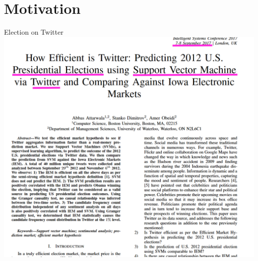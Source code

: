 \documentclass[usenames,dvipsnames,aspectratio=169]{beamer}
\begin{document}
	\section{Motivation}
	\begin{frame}{Election on Twitter}
		\includegraphics[width=\linewidth, keepaspectratio]{pictures/TwitterElection2012/Twitter_Election_2012.png}
	\end{frame}
	
\end{document}

